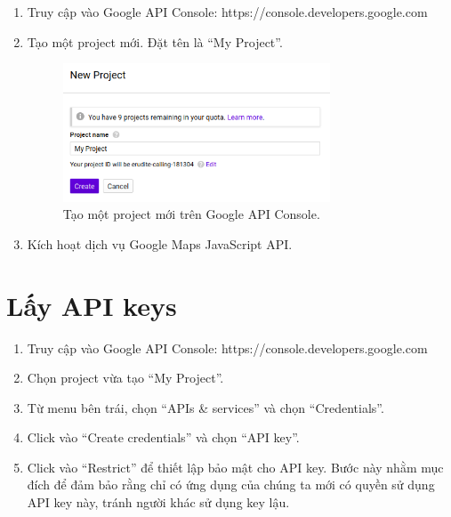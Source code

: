 \documentclass[../thesis.tex]{subfiles}
\begin{document}
\begin{enumerate}
	\item Truy cập vào Google API Console: https://console.developers.google.com 
	\item Tạo một project mới. Đặt tên là ``My Project''.\\
	\begin{figure}
		\includegraphics[width=300px, keepaspectratio]{../images/create_project.png}
		\caption{Tạo một project mới trên Google API Console.}
	\end{figure}
	\item Kích hoạt dịch vụ Google Maps JavaScript API.
\end{enumerate}

\section{Lấy API keys}

\begin{enumerate}
	\item Truy cập vào Google API Console: https://console.developers.google.com 
	\item Chọn project vừa tạo ``My Project''.
	\item Từ menu bên trái, chọn ``APIs \& services'' và chọn ``Credentials''.
	\item Click vào ``Create credentials'' và chọn ``API key''.
	\item Click vào ``Restrict'' để thiết lập bảo mật cho API key. Bước này nhằm mục đích để đảm bảo rằng chỉ có ứng dụng của chúng ta mới có quyền sử dụng API key này, tránh người khác sử dụng key lậu.
\end{enumerate}
\end{document}
